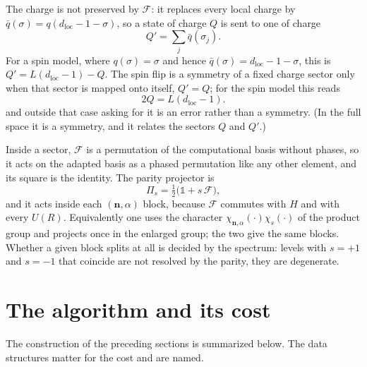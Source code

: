 \documentclass[12pt]{article}
\begin{document}
The charge is not preserved by $\mathcal{F}$: it replaces every local charge by
$\bar q(\sigma) = q(d_{\mathrm{loc}}-1-\sigma)$, so a state of charge $Q$ is sent
to one of charge
\begin{equation}
  Q' = \sum_j \bar q(\sigma_j) .
\end{equation}
For a spin model, where $q(\sigma) = \sigma$ and hence
$\bar q(\sigma) = d_{\mathrm{loc}}-1-\sigma$, this is
$Q' = L(d_{\mathrm{loc}}-1) - Q$. The spin flip is a symmetry of a fixed charge
sector only when that sector is mapped onto itself, $Q' = Q$; for the spin model
this reads
\begin{equation}
  2Q = L(d_{\mathrm{loc}}-1).
  \label{eq:selfconj}
\end{equation}
and outside that case asking for it is an error rather than a symmetry. (In the
full space it is a symmetry, and it relates the sectors $Q$ and $Q'$.)

Inside a sector, $\mathcal{F}$ is a permutation of the computational basis
without phases, so it acts on the adapted basis as a phased permutation like any
other element, and its square is the identity. The parity projector is
\begin{equation}
  \Pi_{s} = \tfrac12\bigl(\mathbb{1} + s\,\mathcal{F}\bigr),
\end{equation}
and it acts inside each $(\mathbf{n},\alpha)$ block, because $\mathcal{F}$
commutes with $H$ and with every $U(R)$. Equivalently one uses the character
$\chi_{\mathbf{n},\alpha}(\cdot)\chi_s(\cdot)$ of the product group and projects
once in the enlarged group; the two give the same blocks. Whether a given block
splits at all is decided by the spectrum: levels with $s = +1$ and $s=-1$ that
coincide are not resolved by the parity, they are degenerate.

\section{The algorithm and its cost}\label{sec:algorithm}

The construction of the preceding sections is summarized below. The data
structures matter for the cost and are named.
\end{document}
